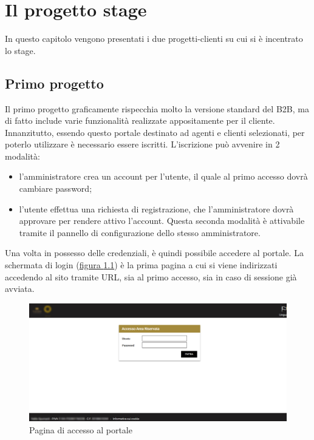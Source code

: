 \chapter{Il progetto stage}
\begin{flushright}
	\parbox{13cm}{\small In questo capitolo vengono presentati i due progetti-clienti su cui si è incentrato lo stage.}
\end{flushright}

\section{Primo progetto}
Il primo progetto graficamente rispecchia molto la versione standard del B2B, ma di fatto include varie funzionalità realizzate appositamente per il cliente.
Innanzitutto, essendo questo portale destinato ad agenti e clienti selezionati, per poterlo utilizzare è necessario essere iscritti. L'iscrizione può avvenire in 2 modalità:
\begin{itemize}
	\item l'amministratore crea un account per l'utente, il quale al primo accesso dovrà cambiare password;
	\item l'utente effettua una richiesta di registrazione, che l'amministratore dovrà approvare per rendere attivo l'account. Questa seconda modalità è attivabile tramite il pannello di configurazione dello stesso amministratore.
\end{itemize}
Una volta in possesso delle credenziali, è quindi possibile accedere al portale. La schermata di login (\hyperref[fig:login1]{figura \ref{fig:login1}}) è la prima pagina a cui si viene indirizzati accedendo al sito tramite URL, sia al primo accesso, sia in caso di sessione già avviata.
\begin{figure}
	\centering
	\includegraphics[width=\linewidth]{Immagini/p1/index.png}
	\caption{Pagina di accesso al portale}
	\label{fig:login1}
\end{figure}

